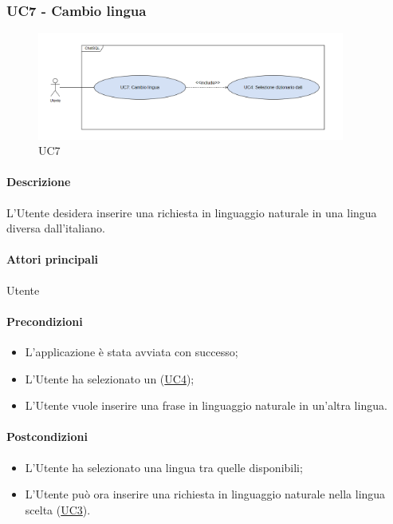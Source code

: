 \subsubsection{UC7 - Cambio lingua}\label{UC7}

\begin{figure}[H]
  \centering
  \includegraphics[width=0.90\textwidth]{assets/uc7.png}
  \caption{UC7}
\end{figure}

\paragraph*{Descrizione}
L’Utente desidera inserire una richiesta in linguaggio naturale in una lingua diversa dall’italiano.

\paragraph*{Attori principali}
Utente

\paragraph*{Precondizioni}
\begin{itemize}
  \item L'applicazione è stata avviata con successo;
  \item L'Utente ha selezionato un  (\hyperref[UC4]{UC4});
  \item L’Utente vuole inserire una frase in linguaggio naturale in un'altra lingua.
\end{itemize}

\paragraph*{Postcondizioni}
\begin{itemize}
  \item L'Utente ha selezionato una lingua tra quelle disponibili;
  \item L'Utente può ora inserire una richiesta in linguaggio naturale nella lingua scelta (\hyperref[UC3]{UC3}).
\end{itemize}

